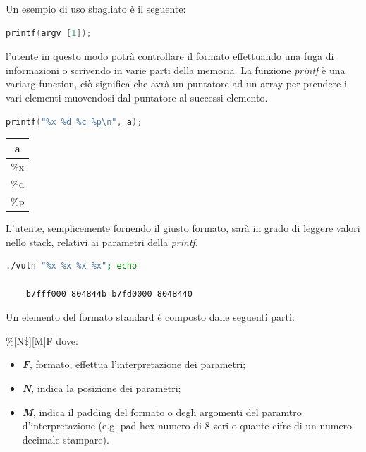 Un esempio di uso sbagliato è il seguente:
\begin{lstlisting}[language=C]
    printf(argv [1]);
\end{lstlisting}
l'utente in questo modo potrà controllare il formato effettuando una fuga di informazioni o scrivendo in varie parti della memoria.
La funzione \textit{printf} è una variarg function, ciò significa che avrà un puntatore ad un array per prendere i vari elementi muovendosi dal puntatore al successi elemento.
\newline
\begin{minipage}{0.7\textwidth}
    \begin{lstlisting}[language=C]
        printf("%x %d %c %p\n", a);
    \end{lstlisting}
\end{minipage}
\begin{minipage}{0.5\textwidth}
    \centering
    \begin{tabular}{|c|}
        \hline
        a \\
        \hline
        \%x \\
        \hline
        \%d \\
        \hline
        \%p \\
        \hline
    \end{tabular}
\end{minipage}

L'utente, semplicemente fornendo il giusto formato, sarà in grado di leggere valori nello stack, relativi ai parametri della \textit{printf}.
\begin{lstlisting}[language=bash]
    ./vuln "%x %x %x %x"; echo
    
    b7fff000 804844b b7fd0000 8048440
\end{lstlisting}

Un elemento del formato standard è composto dalle seguenti parti:

\%[N\$][M]F dove:
\begin{itemize}
    \item \textit{\textbf{F}}, formato, effettua l'interpretazione dei parametri;
    \item \textit{\textbf{N}}, indica la posizione dei parametri;
    \item \textit{\textbf{M}}, indica il padding del formato o degli argomenti del paramtro d'interpretazione (e.g. pad hex numero di 8 zeri o quante cifre di un numero decimale stampare).
\end{itemize}

